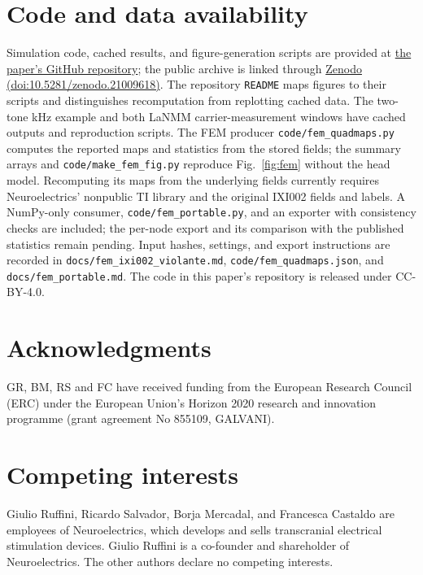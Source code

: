 \documentclass[11pt,a4paper]{article}
\newif\ifjne
\begin{document}
\section*{Code and data availability}
Simulation code, cached results, and figure-generation scripts are provided at
\href{https://github.com/giulioruffini/TI-demodulation-paper}{the paper's GitHub repository};
the public archive is linked through
\href{https://doi.org/10.5281/zenodo.21009618}{Zenodo (doi:10.5281/zenodo.21009618)}.
The repository \texttt{README} maps figures to their scripts and distinguishes
recomputation from replotting cached data. The two-tone kHz example and both LaNMM carrier-measurement windows have
cached outputs and reproduction scripts. The FEM producer \texttt{code/fem\_quadmaps.py} computes the reported maps
and statistics from the stored fields; the summary arrays and
\texttt{code/make\_fem\_fig.py} reproduce Fig.~\ref{fig:fem} without the head model. Recomputing its maps
from the underlying fields currently requires Neuroelectrics' nonpublic
TI library and the original IXI002 fields and labels. A NumPy-only consumer,
\texttt{code/fem\_portable.py}, and an exporter with consistency checks are included;
the per-node export and its comparison with the published statistics remain
pending. Input hashes, settings, and export instructions are recorded in
\texttt{docs/fem\_ixi002\_violante.md}, \texttt{code/fem\_quadmaps.json},
and \texttt{docs/fem\_portable.md}.
The code in this paper's repository is released under CC-BY-4.0.

\section*{Acknowledgments}
GR, BM, RS and FC have received funding from the European Research Council (ERC) under the
European Union's Horizon 2020 research and innovation programme (grant agreement No 855109,
GALVANI).

\ifjne
\section*{Competing interests}
Giulio Ruffini, Ricardo Salvador, Borja Mercadal, and Francesca Castaldo are employees of
Neuroelectrics, which develops and sells transcranial electrical stimulation devices.
Giulio Ruffini is a co-founder and shareholder of Neuroelectrics. The other authors
declare no competing interests.
\end{document}
